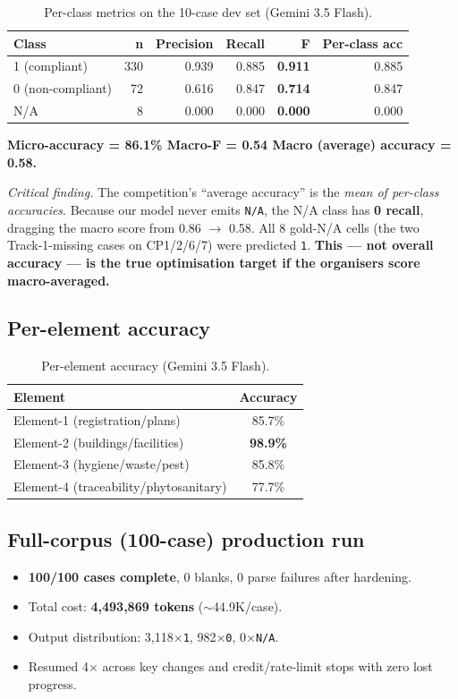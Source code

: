 \documentclass[11pt,a4paper]{article}
\begin{document}
\begin{table}[htbp]\centering\small
\caption{Per-class metrics on the 10-case dev set (Gemini 3.5 Flash).}
\begin{tabular}{@{}lrrrrr@{}}
\toprule
\textbf{Class} & \textbf{n} & \textbf{Precision} & \textbf{Recall} & \textbf{F} & \textbf{Per-class acc} \\
\midrule
1 (compliant) & 330 & 0.939 & 0.885 & \textbf{0.911} & 0.885 \\
0 (non-compliant) & 72 & 0.616 & 0.847 & \textbf{0.714} & 0.847 \\
N/A & 8 & 0.000 & 0.000 & \textbf{0.000} & 0.000 \\
\bottomrule
\end{tabular}
\end{table}

\textbf{Micro-accuracy = 86.1\% \quad Macro-F = 0.54 \quad Macro (average) accuracy = 0.58.}

\emph{Critical finding.} The competition's ``average accuracy'' is the \emph{mean of per-class accuracies}. Because our model never emits \texttt{N/A}, the N/A class has \textbf{0 recall}, dragging the macro score from 0.86 $\to$ 0.58. All 8 gold-N/A cells (the two Track-1-missing cases on CP1/2/6/7) were predicted \texttt{1}. \textbf{This --- not overall accuracy --- is the true optimisation target if the organisers score macro-averaged.}

\subsection{Per-element accuracy}
\begin{table}[htbp]\centering\small
\caption{Per-element accuracy (Gemini 3.5 Flash).}
\begin{tabular}{@{}lc@{}}
\toprule
\textbf{Element} & \textbf{Accuracy} \\
\midrule
Element-1 (registration/plans) & 85.7\% \\
Element-2 (buildings/facilities) & \textbf{98.9\%} \\
Element-3 (hygiene/waste/pest) & 85.8\% \\
Element-4 (traceability/phytosanitary) & 77.7\% \\
\bottomrule
\end{tabular}
\end{table}

\subsection{Full-corpus (100-case) production run}
\begin{itemize}[itemsep=2pt]
  \item \textbf{100/100 cases complete}, 0 blanks, 0 parse failures after hardening.
  \item Total cost: \textbf{4,493,869 tokens} ($\sim$44.9K/case).
  \item Output distribution: 3{,}118$\times$\texttt{1}, 982$\times$\texttt{0}, 0$\times$\texttt{N/A}.
  \item Resumed 4$\times$ across key changes and credit/rate-limit stops with zero lost progress.
\end{itemize}
\end{document}
